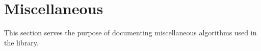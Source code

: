 \section{Miscellaneous}
\label{sec:misc}

    This section serves the purpose of documenting miscellaneous algorithms used
    in the library.


